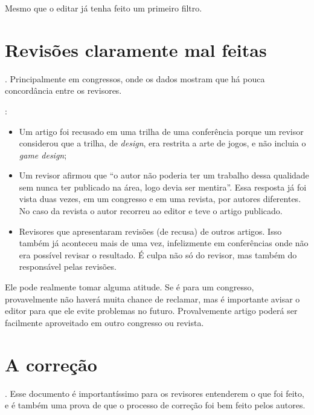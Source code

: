 \documentclass[openany]{book}
\begin{document}

 Mesmo que o editar já tenha feito um primeiro filtro.

\section{Revisões claramente mal feitas}


. Principalmente em congressos, onde os dados mostram que há pouca concordância entre os revisores\favorcitar.

:
\begin{itemize}
    \item Um artigo foi recusado em uma trilha de uma conferência porque um revisor considerou que a trilha, de \textit{design}, era restrita a arte de jogos, e não incluia o \textit{game design};
    \item Um revisor afirmou que ``o autor não poderia ter um trabalho dessa qualidade sem nunca ter publicado na área, logo devia ser mentira''.  Essa resposta já foi vista duas vezes, em um congresso e em uma revista, por autores diferentes. No caso da revista o autor recorreu ao editor e teve o artigo publicado.
    \item Revisores que apresentaram revisões (de recusa) de outros artigos. Isso também já aconteceu mais de uma vez, infelizmente em conferências onde não era possível revisar o resultado. É culpa não só do revisor, mas também do responsável pelas revisões.
\end{itemize}

 Ele pode realmente tomar alguma atitude. Se é para um congresso, provavelmente não haverá muita chance de reclamar, mas é importante avisar o editor para que ele evite problemas no futuro. Provalvemente artigo poderá ser facilmente aproveitado em outro congresso ou revista.

\section{A correção}

. Esse documento é importantíssimo para os revisores entenderem o que foi feito, e é também uma prova de que o processo de correção foi bem feito pelos autores.
\end{document}
